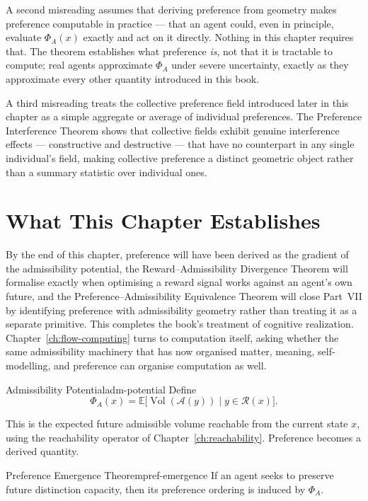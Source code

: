 \documentclass[12pt,twoside,openright]{book}
\newcommand{\reach}{\mathcal{R}}
\newcommand{\adm}{\mathcal{A}}
\newcommand{\Vol}{\operatorname{Vol}}
\begin{document}
A second misreading assumes that deriving preference from
geometry makes preference computable in practice --- that an
agent could, even in principle, evaluate $\Phi_A(x)$ exactly
and act on it directly. Nothing in this chapter requires
that. The theorem establishes what preference \emph{is},
not that it is tractable to compute; real agents approximate
$\Phi_A$ under severe uncertainty, exactly as they
approximate every other quantity introduced in this book.

A third misreading treats the collective preference field
introduced later in this chapter as a simple aggregate or
average of individual preferences. The Preference
Interference Theorem shows that collective fields exhibit
genuine interference effects --- constructive and
destructive --- that have no counterpart in any single
individual's field, making collective preference a distinct
geometric object rather than a summary statistic over
individual ones.

\section{What This Chapter Establishes}
\label{sec:ch22-preview}

By the end of this chapter, preference will have been derived
as the gradient of the admissibility potential, the
Reward--Admissibility Divergence Theorem will formalise
exactly when optimising a reward signal works against an
agent's own future, and the Preference--Admissibility
Equivalence Theorem will close Part~VII by identifying
preference with admissibility geometry rather than treating
it as a separate primitive. This completes the book's
treatment of cognitive realization. Chapter~\ref{ch:flow-computing}
turns to computation itself, asking whether the same
admissibility machinery that has now organised matter,
meaning, self-modelling, and preference can organise
computation as well.

\begin{definition}{Admissibility Potential}{adm-potential}
  Define
  \[
    \Phi_A(x)
    = \mathbb{E}\bigl[
        \Vol(\adm(y)) \mid y \in \reach(x)
      \bigr].
  \]
\end{definition}

This is the expected future admissible volume reachable
from the current state $x$, using the reachability operator
of Chapter~\ref{ch:reachability}. Preference becomes a
derived quantity.

\begin{theorem}{Preference Emergence Theorem}{pref-emergence}
  If an agent seeks to preserve future distinction capacity,
  then its preference ordering is induced by $\Phi_A$.
\end{theorem}
\end{document}
